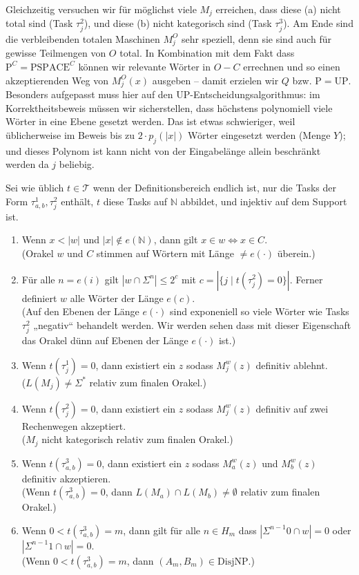 \documentclass[nofonts]{uebung}
\theoremstyle{definition}
\def\P{\ensuremath{\mathrm{P}}}
\def\UP{\ensuremath{\mathrm{UP}}}
\def\DisjNP{\ensuremath{\mathrm{DisjNP}}}
\begin{document}
Gleichzeitig versuchen wir für möglichst viele $M_j$ erreichen, dass diese (a) nicht total sind (Task $\tau^2_j$), und diese (b) nicht kategorisch sind (Task $\tau^3_j$).
Am Ende sind die verbleibenden totalen Maschinen $M^O_j$ sehr speziell, denn sie sind auch für gewisse Teilmengen von $O$ total.
In Kombination mit dem Fakt dass $\P^C=\mathrm{PSPACE}^C$ können wir relevante Wörter in $O-C$ errechnen und so einen akzeptierenden Weg von $M^O_j(x)$ ausgeben -- damit erzielen wir $Q$ bzw. $\P=\UP$.
Besonders aufgepasst muss hier auf den $\UP$-Entscheidungsalgorithmus: im Korrektheitsbeweis müssen wir sicherstellen, dass höchstens polynomiell viele Wörter in eine Ebene gesetzt werden. Das ist etwas schwieriger, weil üblicherweise im Beweis bis zu $2\cdot p_j(|x|)$ Wörter eingesetzt werden (Menge $Y$); und dieses Polynom ist kann nicht von der Eingabelänge allein beschränkt werden da $j$ beliebig.

Sei wie üblich $t\in \mathcal T$ wenn der Definitionsbereich endlich ist, nur die Tasks der Form $\tau^1_{a,b}, \tau^2_j$ enthält, $t$ diese Tasks auf $\mathbb N$ abbildet, und injektiv auf dem Support ist.

\begin{enumerate}[label={V\arabic*}]
    \item Wenn $x<|w|$ und $|x|\not\in e(\mathbb N)$, dann gilt $x\in w\iff x\in C$.\\
        (Orakel $w$ und $C$ stimmen auf Wörtern mit Länge $\neq e(\cdot)$ überein.)
    \item Für alle $n=e(i)$ gilt $|w\cap \Sigma^n|\leq 2^{c}$ mit $c=|\{j\mid t(\tau^2_j)=0 \}|$.
        Ferner definiert $w$ alle Wörter der Länge $e(c)$.\\
        (Auf den Ebenen der Länge $e(\cdot)$ sind exponeniell so viele Wörter wie Tasks $\tau^2_j$ „negativ“ behandelt werden. Wir werden sehen dass mit dieser Eigenschaft das Orakel dünn auf Ebenen der Länge $e(\cdot)$ ist.)
    \item Wenn $t(\tau^1_j)=0$, dann existiert ein $z$ sodass $M_j^w(z)$ definitiv ablehnt.\\
        ($L(M_j)\neq \Sigma^*$ relativ zum finalen Orakel.)
    \item Wenn $t(\tau^2_j)=0$, dann existiert ein $z$ sodass $M_j^w(z)$ definitiv auf zwei Rechenwegen akzeptiert.\\
        ($M_j$ nicht kategorisch relativ zum finalen Orakel.)
    \item Wenn $t(\tau^3_{a,b})=0$, dann existiert ein $z$ sodass $M_a^w(z)$ und $M_b^w(z)$ definitiv akzeptieren.\\
        (Wenn $t(\tau^3_{a,b})=0$, dann $L(M_a)\cap L(M_b)\neq \emptyset$ relativ zum finalen Orakel.)
    \item Wenn $0<t(\tau^3_{a,b})=m$, dann gilt für alle $n\in H_m$ dass $|\Sigma^{n-1}0\cap w|=0$ oder $|\Sigma^{n-1}1\cap w|=0$.\\
        (Wenn $0<t(\tau^3_{a,b})=m$, dann $(A_m,B_m)\in\DisjNP$.)
\end{enumerate}
\end{document}
